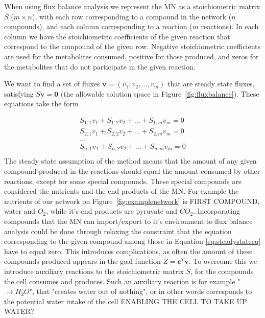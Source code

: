 \documentclass[a4paper,12pt]{article}
\begin{document}
	When using flux balance analysis we represent the MN as a stoichiometric matrix $S$ ($m\times n$), with each row corresponding to a compound in the network ($n$ compounds), and each column corresponding to a reaction ($m$ reactions). In each column we have the stoichiometric coefficients of the given reaction that correspond to the compound of the given row. Negative stoichiometric coefficients are used for the metabolites consumed, positive for those produced, and zeros for the metabolites that do not participate in the given reaction.
	
	We want to find a set of fluxes  $\mathbf{v}=\left( v_1,v_2,...,v_m \right)$ that are steady state fluxes, satisfying $S\mathbf{v}=\mathbf{0}$ (the allowable solution space in Figure~\ref{fig:fluxbalance}). These equations take the form
	
	\begin{equation}\label{eq:steadystateeq}
		\begin{matrix}
			S_{1,1} v_1 + S_{1,2} v_2 + ... + S_{1,m} v_m=0 \\
			S_{2,1} v_1 + S_{2,2} v_2 + ... + S_{2,m} v_m=0 \\
			... \\
			S_{n,1} v_1 + S_{n,2} v_2 + ... + S_{n,m} v_m=0 \\
		\end{matrix}
	\end{equation}
	The steady state assumption of the method means that the amount of any given compound produced in the reactions should equal the amount consumed by other reactions, except for some special compounds. These special compounds are considered the nutrients and the end-products of the MN. For example the nutrients of our network on Figure~\ref {fig:examplenetwork} is FIRST COMPOUND, water and $O_2$, while it's end products are pyruvate and $CO_2$. Incorporating compounds that the MN can import/export to it's environment to flux balance analysis could be done through relaxing the constraint that the equation corresponding to the given compound among those in Equation \ref{eq:steadystateeq} have to equal zero. This introduces complications, as often the amount of these compounds produced appears in the goal function  $Z=\mathbf{c}^T \mathbf{v}$. To overcome this we introduce auxiliary reactions to the stoichiometric matrix $S$, for the compounds the cell consumes and produces. Such an auxiliary reaction is for example " $ \rightarrow H_2O$", that "creates water out of nothing", or in other words corresponds to the potential water intake of the cell ENABLING THE CELL TO TAKE UP WATER?
\end{document}

